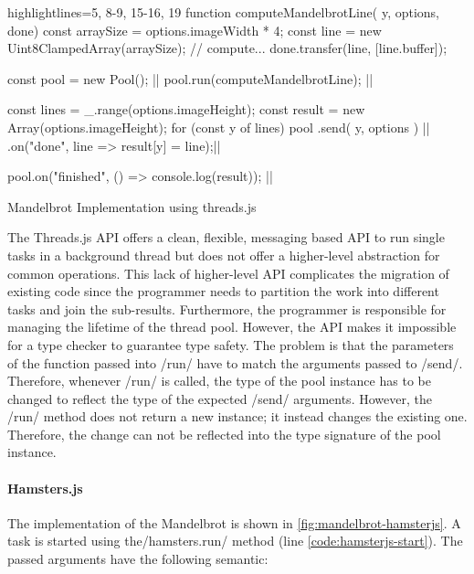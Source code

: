 \begin{listing}
	\begin{javascriptcode*}{highlightlines={5, 8-9, 15-16, 19}}
function computeMandelbrotLine({ y, options}, done) {
	const arraySize = options.imageWidth * 4;
	const line = new Uint8ClampedArray(arraySize);
	// compute...
	done.transfer(line, [line.buffer]);
}

const pool = new Pool(); |$\label{code:threadsjs-pool}$|
pool.run(computeMandelbrotLine); |$\label{code:threadsjs-worker}$|

const lines = _.range(options.imageHeight);
const result = new Array(options.imageHeight);
for (const y of lines) {
	pool
		.send({ y, options }) |$\label{code:threadsjs-messaging}$|
		.on("done", line => result[y] = line);|$\label{code:threadsjs-task-completion}$|
}

pool.on("finished", () => console.log(result)); |$\label{code:threadsjs-done}$|
\end{javascriptcode*}
\caption{Mandelbrot Implementation using threads.js}
\label{fig:mandelbrot-threadsjs}
\end{listing}


The Threads.js API offers a clean, flexible, messaging based API to run single tasks in a background thread but does not offer a higher-level abstraction for common operations. This lack of higher-level API complicates the migration of existing code since the programmer needs to partition the work into different tasks and join the sub-results. Furthermore, the programmer is responsible for managing the lifetime of the thread pool. However, the API makes it impossible for a type checker to guarantee type safety. The problem is that the parameters of the function passed into \javascriptinline/run/ have to match the arguments passed to \javascriptinline/send/. Therefore, whenever \javascriptinline/run/ is called, the type of the pool instance has to be changed to reflect the type of the expected \javascriptinline/send/ arguments. However, the \javascriptinline/run/ method does not return a new instance; it instead changes the existing one. Therefore, the change can not be reflected into the type signature of the pool instance.

\paragraph{Hamsters.js}
The implementation of the Mandelbrot is shown in \cref{fig:mandelbrot-hamsterjs}. A task is started using the\javascriptinline/hamsters.run/ method (line \ref{code:hamsterjs-start}). The passed arguments have the following semantic:

